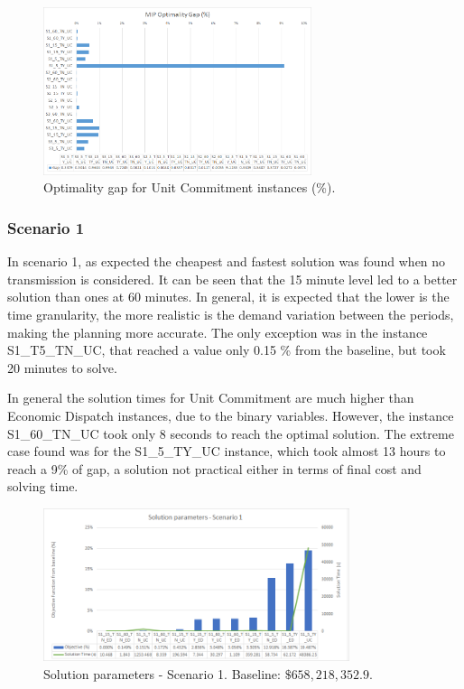 \documentclass[12pt,LUDisStyle,twosided]{book}
\begin{document}
\begin{figure}[H] 
  \centering
	  \includegraphics[width=0.7\textwidth,keepaspectratio]{mipgap.png}
  \caption{Optimality gap for Unit Commitment instances (\%).}
  \label{fig:mipgap}
\end{figure}


\subsubsection{Scenario 1}
In scenario 1, as expected the cheapest and fastest solution was found when no transmission is considered. It can be seen that the 15 minute level led to a better solution than ones at 60 minutes. In general, it is expected that the lower is the time granularity, the more realistic is the demand variation between the periods, making the planning more accurate. The only exception was in the instance S1\_T5\_TN\_UC, that reached a value only 0.15 \% from the baseline, but took 20 minutes to solve. 

In general the solution times for Unit Commitment are much higher than Economic Dispatch instances, due to the binary variables. However, the instance S1\_60\_TN\_UC took only 8 seconds to reach the optimal solution. The extreme case found was for the S1\_5\_TY\_UC instance, which took almost 13 hours to reach a 9\% of gap, a solution not practical either in terms of final cost and solving time.

\begin{figure}[H] 
  \centering
	  \includegraphics[width=0.8\textwidth,height=\textheight,keepaspectratio]{SolutionParametersS1.png}
  \caption{Solution parameters - Scenario 1. Baseline: $\$658,218,352.9$.}
  \label{fig:solutionparameterss1}
\end{figure}
\end{document}
